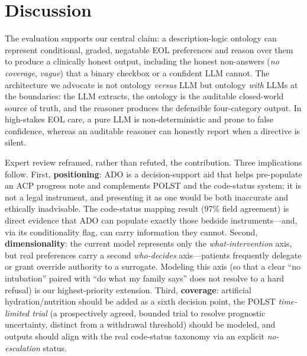 \documentclass[10pt]{article}
\begin{document}
\section{Discussion}
The evaluation supports our central claim: a description-logic ontology can represent conditional, graded, negatable EOL preferences and reason over them to produce a clinically honest output, including the honest non-answers (\emph{no coverage}, \emph{vague}) that a binary checkbox or a confident LLM cannot. The architecture we advocate is not ontology \emph{versus} LLM but ontology \emph{with} LLMs at the boundaries: the LLM extracts, the ontology is the auditable closed-world source of truth, and the reasoner produces the defensible four-category output. In high-stakes EOL care, a pure LLM is non-deterministic and prone to false confidence, whereas an auditable reasoner can honestly report when a directive is silent.

Expert review reframed, rather than refuted, the contribution. Three implications follow. First, \textbf{positioning}: ADO is a decision-support aid that helps pre-populate an ACP progress note and complements POLST and the code-status system; it is not a legal instrument, and presenting it as one would be both inaccurate and ethically inadvisable. The code-status mapping result (97\% field agreement) is direct evidence that ADO can populate exactly those bedside instruments---and, via its conditionality flag, can carry information they cannot. Second, \textbf{dimensionality}: the current model represents only the \emph{what-intervention} axis, but real preferences carry a second \emph{who-decides} axis---patients frequently delegate or grant override authority to a surrogate. Modeling this axis (so that a clear ``no intubation'' paired with ``do what my family says'' does not resolve to a hard refusal) is our highest-priority extension. Third, \textbf{coverage}: artificial hydration/nutrition should be added as a sixth decision point, the POLST \emph{time-limited trial} (a prospectively agreed, bounded trial to resolve prognostic uncertainty, distinct from a withdrawal threshold) should be modeled, and outputs should align with the real code-status taxonomy via an explicit \emph{no-escalation} status.
\end{document}

